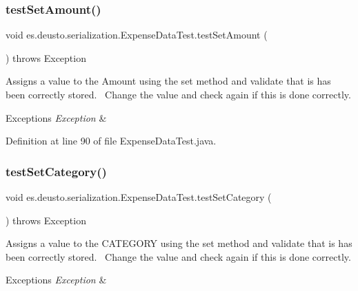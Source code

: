 \subsubsection{\texorpdfstring{test\+Set\+Amount()}{testSetAmount()}}
{\footnotesize\ttfamily void es.\+deusto.\+serialization.\+Expense\+Data\+Test.\+test\+Set\+Amount (\begin{DoxyParamCaption}{ }\end{DoxyParamCaption}) throws Exception}

Assigns a value to the Amount using the set method and validate that is has been correctly stored.~\newline
Change the value and check again if this is done correctly. 
\begin{DoxyExceptions}{Exceptions}
{\em Exception} & \\
\hline
\end{DoxyExceptions}


Definition at line 90 of file Expense\+Data\+Test.\+java.

\mbox{\label{classes_1_1deusto_1_1serialization_1_1_expense_data_test_a3b5cd1baa1d480f9f5f1e484161a5cee}} 
\subsubsection{\texorpdfstring{test\+Set\+Category()}{testSetCategory()}}
{\footnotesize\ttfamily void es.\+deusto.\+serialization.\+Expense\+Data\+Test.\+test\+Set\+Category (\begin{DoxyParamCaption}{ }\end{DoxyParamCaption}) throws Exception}

Assigns a value to the C\+A\+T\+E\+G\+O\+RY using the set method and validate that is has been correctly stored.~\newline
Change the value and check again if this is done correctly. 
\begin{DoxyExceptions}{Exceptions}
{\em Exception} & \\
\hline
\end{DoxyExceptions}


